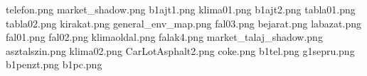 telefon.png
market_shadow.png
b1ajt1.png
klima01.png
b1ajt2.png
tabla01.png
tabla02.png
kirakat.png
general_env_map.png
fal03.png
bejarat.png
labazat.png
fal01.png
fal02.png
klimaoldal.png
falak4.png
market_talaj_shadow.png
asztalszin.png
klima02.png
CarLotAsphalt2.png
coke.png
b1tel.png
g1sepru.png
b1penzt.png
b1pc.png
